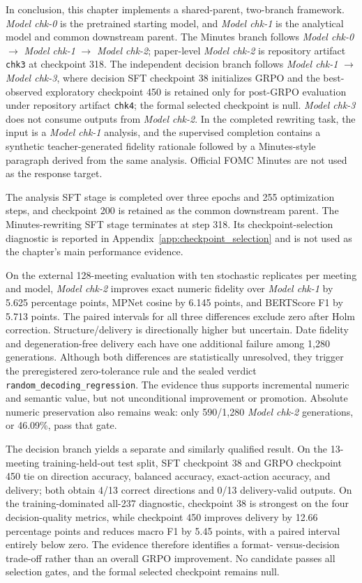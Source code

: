 In conclusion, this chapter implements a shared-parent, two-branch framework.
\textit{Model chk-0} is the pretrained starting model, and \textit{Model
chk-1} is the analytical model and common downstream parent. The Minutes
branch follows \textit{Model chk-0} $\rightarrow$ \textit{Model
chk-1} $\rightarrow$ \textit{Model chk-2}; paper-level \textit{Model chk-2} is
repository artifact \texttt{chk3} at checkpoint 318. The independent decision
branch follows \textit{Model chk-1} $\rightarrow$ \textit{Model chk-3}, where
decision SFT checkpoint 38 initializes GRPO and the best-observed exploratory
checkpoint 450 is retained only for post-GRPO evaluation under repository
artifact \texttt{chk4}; the formal selected checkpoint is null. \textit{Model
chk-3} does not consume outputs from \textit{Model chk-2}. In the completed
rewriting task, the input is a \textit{Model chk-1} analysis, and the
supervised completion contains a synthetic teacher-generated fidelity rationale
followed by a Minutes-style paragraph derived from the same analysis.  Official
FOMC Minutes are not used as the response target.

The analysis SFT stage is completed over three epochs and 255 optimization
steps, and checkpoint 200 is retained as the common downstream parent. The
Minutes-rewriting SFT stage terminates at step 318. Its checkpoint-selection
diagnostic is reported in Appendix~\ref{app:checkpoint_selection} and is not
used as the chapter's main performance evidence.

On the external 128-meeting evaluation with ten stochastic replicates per
meeting and model, \textit{Model chk-2} improves exact numeric fidelity over
\textit{Model chk-1} by 5.625 percentage points, MPNet cosine by 6.145 points,
and BERTScore F1 by 5.713 points. The paired intervals for all three differences
exclude zero after Holm correction. Structure/delivery is directionally higher
but uncertain. Date fidelity and degeneration-free delivery each have one
additional failure among 1,280 generations. Although both differences are
statistically unresolved, they trigger the preregistered zero-tolerance rule
and the sealed verdict \texttt{random\_decoding\_regression}. The evidence thus
supports incremental numeric and semantic value, but not unconditional
improvement or promotion. Absolute numeric preservation also remains weak:
only 590/1,280 \textit{Model chk-2} generations, or 46.09\%, pass that gate.

The decision branch yields a separate and similarly qualified result. On the
13-meeting training-held-out test split, SFT checkpoint 38 and GRPO checkpoint
450 tie on direction accuracy, balanced accuracy, exact-action accuracy, and
delivery; both obtain 4/13 correct directions and 0/13 delivery-valid outputs.
On the training-dominated all-237 diagnostic, checkpoint 38 is strongest on
the four decision-quality metrics, while checkpoint 450 improves delivery by
12.66 percentage points and reduces macro F1 by 5.45 points, with a paired
interval entirely below zero. The evidence therefore identifies a format-
versus-decision trade-off rather than an overall GRPO improvement. No candidate
passes all selection gates, and the formal selected checkpoint remains null.

